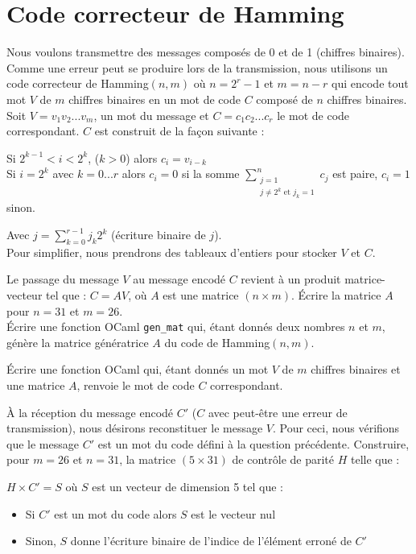 \renewcommand{\SourceFile}{2-jouer-avec-les-mots/src/2-7.ml}

\section{Code correcteur de Hamming}

Nous voulons transmettre des messages composés de 0 et de 1 (chiffres binaires). Comme une erreur peut se produire lors de la transmission, nous utilisons un code correcteur de Hamming$(n,m)$ où $n=2^r-1$ et $m=n-r$ qui encode tout mot $V$ de $m$ chiffres binaires en un mot de code $C$ composé de $n$ chiffres binaires. Soit $V=v_1v_2...v_m$, un mot du message et $C=c_1c_2...c_r$ le mot de code correspondant. $C$ est construit de la façon suivante :
\medskip

Si $2^{k-1} < i < 2^{k}$, ($k > 0$) alors $c_i=v_{i-k}$\\
Si $i=2^k$ avec $k=0...r$ alors $c_i=0$ si la somme $\displaystyle\sum_{\substack{j=1\\ j \neq 2^k \textrm{ et } j_k=1}}^{n}c_j$ est paire, $c_i=1$ sinon.

Avec $\displaystyle j=\sum_{k=0}^{r-1}j_k2^k$ (écriture binaire de $j$).\\
Pour simplifier, nous prendrons des tableaux d'entiers pour stocker $V$ et $C$.

\Q
Le passage du message $V$ au message encodé $C$ revient à un produit matrice-vecteur tel que : $C=AV$, où $A$ est une matrice $(n \times m)$. Écrire la matrice $A$ pour $n=31$ et $m=26$.\\
Écrire une fonction OCaml \texttt{gen\_mat} qui, étant donnés deux nombres $n$ et $m$, génère la matrice génératrice $A$ du code de Hamming$(n,m)$.

\Q
Écrire une fonction OCaml qui, étant donnés un mot $V$ de $m$ chiffres binaires et une matrice $A$, renvoie le mot de code $C$ correspondant.

\Q
À la réception du message encodé $C'$ ($C$ avec peut-être une erreur de transmission), nous désirons reconstituer le message $V$. Pour ceci, nous vérifions que le message $C'$ est un mot du code défini à la question précédente. Construire, pour $m=26$ et $n=31$, la matrice $(5 \times 31)$ de contrôle de parité $H$ telle que :
\medskip

$H \times C' = S$ où $S$ est un vecteur de dimension 5 tel que :
\begin{itemize}
    \item Si $C'$ est un mot du code alors $S$ est le vecteur nul
    \item Sinon, $S$ donne l'écriture binaire de l'indice de l'élément erroné de $C'$
\end{itemize}
\medskip

